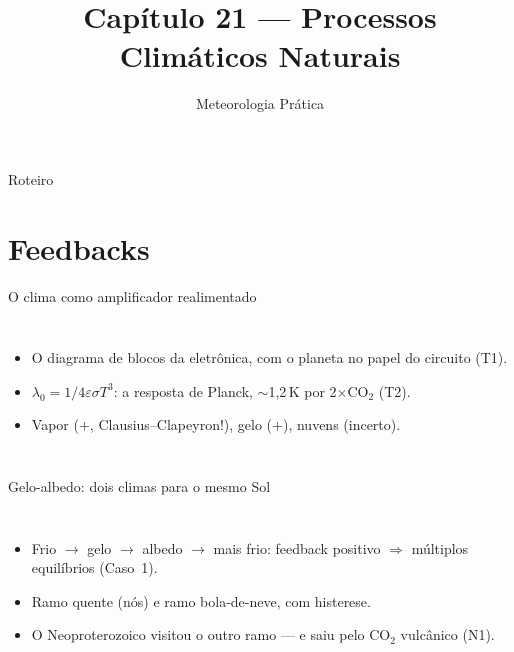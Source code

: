 \documentclass[aspectratio=169,11pt]{beamer}
\title[Cap. 21 --- Clima Natural]{Capítulo 21 --- Processos Climáticos
Naturais}
\subtitle{Meteorologia Prática}
\author{}
\date{}
\begin{document}
\begin{frame}
  \titlepage
  \vfill
  \atribuicao
\end{frame}

\begin{frame}{Roteiro}
  \tableofcontents
\end{frame}

\section{Feedbacks}

\begin{frame}{O clima como amplificador realimentado}
  \begin{columns}
    \vspace{0.4em}
    \begin{itemize}
      \item O diagrama de blocos da eletrônica, com o planeta no
            papel do circuito (T1).
      \item $\lambda_0 = 1/4\varepsilon\sigma T^3$: a resposta de
            Planck, $\sim$1,2\,K por 2$\times$CO$_2$ (T2).
      \item Vapor ($+$, Clausius--Clapeyron!), gelo ($+$), nuvens
            (incerto).
    \end{itemize}
  \end{columns}
\end{frame}

\begin{frame}{Gelo-albedo: dois climas para o mesmo Sol}
  \begin{columns}
    \begin{itemize}
      \item Frio $\to$ gelo $\to$ albedo $\to$ mais frio: feedback
            positivo $\Rightarrow$ múltiplos equilíbrios (Caso~1).
      \item Ramo quente (nós) e ramo bola-de-neve, com histerese.
      \item O Neoproterozoico visitou o outro ramo — e saiu pelo
            CO$_2$ vulcânico (N1).
    \end{itemize}
  \end{columns}
\end{frame}
\end{document}

